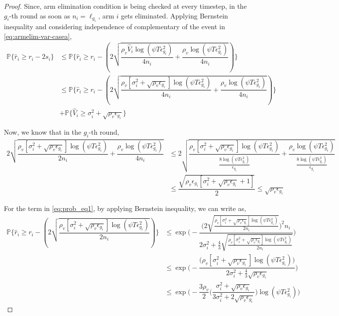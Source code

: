 \begin{proof}
Since, arm elimination condition is being checked at every timestep, in the $g_{i}$-th round as soon as $n_{i}=\ell_{g_{i}}$, arm $i$ gets eliminated. Applying Bernstein inequality and considering independence of complementary of the event in \ref{eq:armelim-var-casea},
  \begin{align}
\mathbb{P}\lbrace\hat{r}_{i}\geq r_{i} - 2s_{i}\rbrace &\leq \mathbb{P}\bigg\lbrace \hat{r}_{i} \geq r_{i}- ( 2\sqrt{\dfrac{\rho_v \hat{V}_{i}\log(\psi T\epsilon_{g_{i}}^{2})}{4n_{i}} + \dfrac{\rho_v \log{(\psi T\epsilon_{g_{i}}^{2})}}{4 n_{i}}}) \bigg\rbrace\\
&\leq \mathbb{P}\bigg\lbrace \hat{r}_{i} \geq r_{i}- (2\sqrt{\dfrac{\rho_v [\sigma_{i}^{2}+\sqrt{\rho_{v}\epsilon_{g_{i}}}]\log(\psi T\epsilon_{g_{i}}^{2})}{4n_{i}} + \dfrac{\rho_v \log{(\psi T\epsilon_{g_{i}}^{2})}}{4 n_{i}}})\bigg\rbrace \label{eq:prob_eq1}\\ 
&+ \mathbb{P}\bigg\lbrace \hat{V}_{i}\geq \sigma_{i}^{2}+\sqrt{\rho_{v}\epsilon_{g_{i}}}\bigg\rbrace \label{eq:prob_eq2}
 \end{align}
 
Now, we know that in the $g_{i}$-th round,
\begin{align*}
2\sqrt{\dfrac{\rho_v [\sigma_{i}^{2}+\sqrt{\rho_{v}\epsilon_{g_{i}}}]\log(\psi T\epsilon_{g_{i}}^{2})}{2n_{i}} + \dfrac{\rho_v \log{(\psi T\epsilon_{g_{i}}^{2})}}{4 n_{i}}} &\leq  2\sqrt{\dfrac{\rho_v [\sigma_{i}^{2}+\sqrt{\rho_{v}\epsilon_{g_{i}}}]\log(\psi T\epsilon_{g_{i}}^{2})}{\frac{8\log(\psi T \epsilon_{g_{i}}^{2})}{\epsilon_{g_{i}}}} + \dfrac{\rho_v \log{(\psi T\epsilon_{g_{i}}^{2})}}{\frac{8\log(\psi T \epsilon_{g_{i}}^{2})}{\epsilon_{g_{i}}}}}\\
& \leq \dfrac{\sqrt{\rho_v \epsilon_{g_{i}}[\sigma_{i}^{2}+\sqrt{\rho_{v}\epsilon_{g_{i}}} + 1]}}{2}\leq \sqrt{\rho_v \epsilon_{g_{i}}}
\end{align*}

For the term in \ref{eq:prob_eq1}, by applying Bernstein inequality, we can write as,
 \begin{align*}
\mathbb{P}\bigg\lbrace \hat{r}_{i} \geq r_{i}- (2\sqrt{\dfrac{\rho_v [\sigma_{i}^{2}+\sqrt{\rho_{v}\epsilon_{g_{i}}}]\log(\psi T\epsilon_{g_{i}}^{2})}{2n_{i}}})\bigg\rbrace &\leq \exp\bigg(- \dfrac{\bigg(2\sqrt{\frac{\rho_v [\sigma_{i}^{2}+\sqrt{\rho_{v}\epsilon_{g_{i}}}]\log(\psi T\epsilon_{g_{i}}^{2})}{2n_{i}}}\bigg)^{2}n_{i}}{2\sigma_{i}^{2}+\frac{4}{3}\sqrt{\frac{\rho_v [\sigma_{i}^{2}+\sqrt{\rho_{v}\epsilon_{g_{i}}}]\log(\psi T\epsilon_{g_{i}}^{2})}{2n_{i}}}}\bigg) \\
&\leq \exp\bigg(- \dfrac{\bigg(\rho_v [\sigma_{i}^{2}+\sqrt{\rho_{v}\epsilon_{g_{i}}}]\log(\psi T\epsilon_{g_{i}}^{2})\bigg)}{2\sigma_{i}^{2}+\frac{4}{3}\sqrt{\rho_v \epsilon_{g_{i}}}} \bigg)\\
&\leq \exp\bigg(- \dfrac{3\rho_v}{2} \bigg(\dfrac{\sigma_{i}^{2}+\sqrt{\rho_{v}\epsilon_{g_{i}}}}{3\sigma_{i}^{2}+2\sqrt{\rho_v \epsilon_{g_{i}}}}\bigg) \log(\psi T\epsilon_{g_{i}}^{2}) \bigg) 
  \end{align*}
  

\end{proof}
